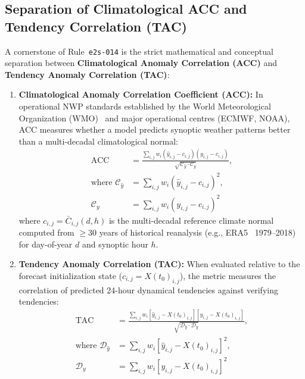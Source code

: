 \documentclass[10pt,twocolumn,letterpaper]{article}
\begin{document}
\subsection{Separation of Climatological ACC and Tendency Correlation (TAC)}
A cornerstone of Rule~\texttt{e2s-014} is the strict mathematical and conceptual separation between \textbf{Climatological Anomaly Correlation (ACC)} and \textbf{Tendency Anomaly Correlation (TAC)}:
\begin{enumerate}
    \item \textbf{Climatological Anomaly Correlation Coefficient (ACC):}
    In operational NWP standards established by the World Meteorological Organization (WMO)~\cite{wmo2012} and major operational centres (ECMWF, NOAA), ACC measures whether a model predicts synoptic weather patterns better than a multi-decadal climatological normal:
    \begin{equation}
    \begin{split}
    \mathrm{ACC} &= \frac{ \sum_{i,j} w_i (\hat{y}_{i,j} - c_{i,j}) (y_{i,j} - c_{i,j}) }{ \sqrt{ \mathcal{C}_{\hat{y}} \cdot \mathcal{C}_y } }, \\
    \text{where } \mathcal{C}_{\hat{y}} &= \sum_{i,j} w_i (\hat{y}_{i,j} - c_{i,j})^2, \\
    \mathcal{C}_y &= \sum_{i,j} w_i (y_{i,j} - c_{i,j})^2
    \end{split}
    \end{equation}
    where $c_{i,j} = \bar{C}_{i,j}(d, h)$ is the multi-decadal reference climate normal computed from $\ge 30$ years of historical reanalysis (e.g., ERA5~\cite{hersbach2020era5} 1979--2018) for day-of-year $d$ and synoptic hour $h$.
    \item \textbf{Tendency Anomaly Correlation (TAC):}
    When evaluated relative to the forecast initialization state ($c_{i,j} = X(t_0)_{i,j}$), the metric measures the correlation of predicted 24-hour dynamical tendencies against verifying tendencies:
    \begin{equation}
    \begin{split}
    \mathrm{TAC} &= \frac{ \sum_{i,j} w_i [\hat{y}_{i,j} - X(t_0)_{i,j}] [y_{i,j} - X(t_0)_{i,j}] }{ \sqrt{ \mathcal{D}_{\hat{y}} \cdot \mathcal{D}_y } }, \\
    \text{where } \mathcal{D}_{\hat{y}} &= \sum_{i,j} w_i [\hat{y}_{i,j} - X(t_0)_{i,j}]^2, \\
    \mathcal{D}_y &= \sum_{i,j} w_i [y_{i,j} - X(t_0)_{i,j}]^2
    \end{split}
    \end{equation}
\end{enumerate}
\end{document}
